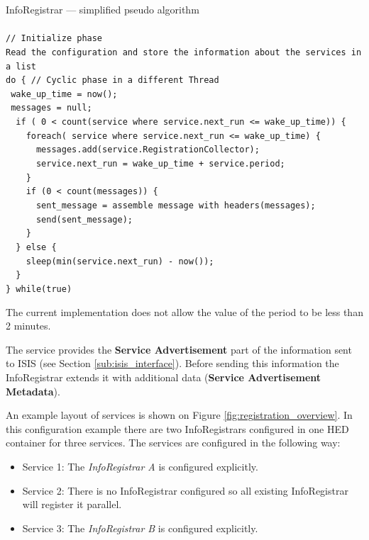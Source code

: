 \documentclass{book}
\begin{document}
\begin{framed}
  InfoRegistrar --- simplified pseudo algorithm\\
  \\
  \verb#// Initialize phase#\\
  \verb#Read the configuration and store the information about the services in a list#\\
  \verb#do { // Cyclic phase in a different Thread#\\
  \verb# wake_up_time = now();#\\
  \verb# messages = null;#\\
  \verb#  if ( 0 < count(service where service.next_run <= wake_up_time)) {#\\
  \verb#    foreach( service where service.next_run <= wake_up_time) {#\\
  \verb#      messages.add(service.RegistrationCollector);#\\
  \verb#      service.next_run = wake_up_time + service.period;#\\
  \verb#    }#\\
  \verb#    if (0 < count(messages)) {#\\
  \verb#      sent_message = assemble message with headers(messages);#\\
  \verb#      send(sent_message);#\\
  \verb#    }#\\
  \verb#  } else {#\\
  \verb#    sleep(min(service.next_run) - now()); #\\
  \verb#  }#\\
  \verb#} while(true)#\\
\end{framed}
The current implementation does not allow the value of the period to be less than 2 minutes.

The service provides the \textbf{Service Advertisement} part of the information sent to ISIS (see Section \ref{sub:isis_interface}).
Before sending this information the InfoRegistrar extends it with additional data (\textbf{Service Advertisement Metadata}).

An example layout of services is shown on Figure \ref{fig:registration_overview}. In this configuration example 
there are two InfoRegistrars configured in one HED container for three services. The services are configured in the following way:

\begin{itemize}
  \item Service 1: The \textit{InfoRegistrar A} is configured explicitly.
  \item Service 2: There is no InfoRegistrar configured so all existing InfoRegistrar will register it parallel.
  \item Service 3: The \textit{InfoRegistrar B} is configured explicitly.
\end{itemize}
\end{document}
